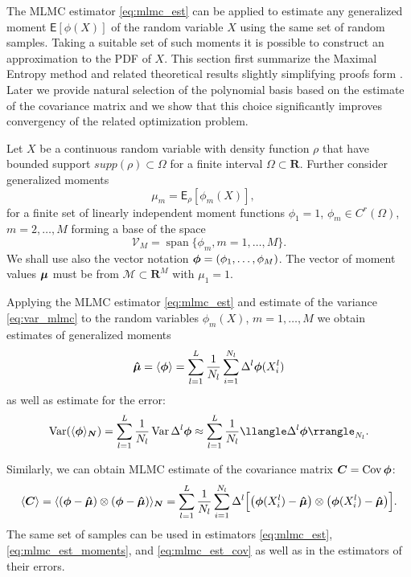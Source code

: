 \documentclass{article}
\def\vc#1{\mathbf{\boldsymbol{#1}}}     %
\def\tn#1{\boldsymbol{#1}}
\def \E{{\mathsf E}}
\def\R{\mathbf{R}}
\def\avg#1{\langle#1\rangle}
\def\var#1{\llangle#1\rrangle}
\def\Var{\mathop{\rm Var}}
\def\Cov{\mathop{\rm Cov}}
\DeclareMathOperator{\Span}{span}
\begin{document}
The MLMC  estimator \eqref{eq:mlmc_est} can be applied to estimate any generalized moment $\E[\phi(X)]$ 
of the random variable $X$ using the same set of random samples. Taking a suitable 
set of such moments it is possible to construct an approximation to the PDF of $X$. This section first
summarize the Maximal Entropy method and related theoretical results slightly simplifying proofs form \cite{Barron1991}. Later we provide natural selection of the polynomial basis based on the estimate of the covariance matrix and we show that this choice significantly improves convergency of the related optimization problem.

Let $X$ be a continuous random variable with density function $\rho$ that have bounded support
$supp(\rho) \subset \Omega$ for a finite interval $\Omega \subset \R$. Further consider generalized moments
\begin{equation}
    \label{eq:gen_moments}
    \mu_m = \E_{\rho}[\phi_m(X)], \quad 
\end{equation}
for a finite set of linearly independent moment functions $\phi_1=1$, $\phi_m\in C^r(\Omega)$, $m=2,\dots, M$ forming a base of the space
\[
    \mathcal V_M = \Span\{\phi_m, m=1,\dots, M\}.
\] 
We shall use also the vector notation $\vphi = (\phi_1, \dots,\phi_M)$. The vector of moment values
$\vmu$ must be from $\mathcal M \subset \R^M$ with $\mu_1 = 1$.

Applying the MLMC estimator \eqref{eq:mlmc_est} and estimate of the variance \eqref{eq:var_mlmc} 
to the random variables $\phi_m(X)$, $m=1,\dots, M$ we obtain estimates of generalized moments
\begin{equation}
    \label{eq:mlmc_est_moments}
    \estvmu = \avg{\vphi} = \sum_{l=1}^L \frac{1}{N_l} \sum_{i=1}^{N_l} \Delta^l\vphi(X_i^l)
\end{equation}
as well as estimate for the error:
\[
    \Var(\avg{\vphi}_{\vc N}) =  \sum_{l=1}^{L} \frac{1}{N_l} \Var{\Delta^l\vphi} 
    \approx \sum_{l=1}^{L} \frac{1}{N_l} \var{\Delta^l\vphi}_{N_l}.
\]

Similarly, we can obtain MLMC estimate of the covariance matrix $\tn C = \Cov{\vc\phi}$: 
\begin{equation}
    \label{eq:mlmc_est_cov}
    \avg{\tn C} = \avg{(\vphi - \estvmu)\otimes(\vphi - \estvmu)}_{\vc N} = 
    \sum_{l=1}^L \frac{1}{N_l} \sum_{i=1}^{N_l} \Delta^l\Big[ 
    \big(\vphi(X_i^l) - \estvmu\big)\otimes\big(\vphi(X_i^l) - \estvmu\big)\Big].
\end{equation}
The same set of samples can be used in estimators \eqref{eq:mlmc_est}, \eqref{eq:mlmc_est_moments}, and \eqref{eq:mlmc_est_cov} as well as in the estimators of their errors.
\end{document}
